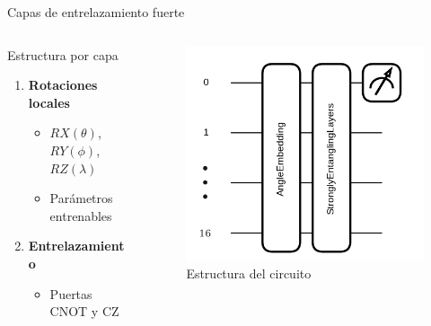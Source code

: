 \documentclass[aspectratio=43]{beamer}
\begin{document}
\begin{frame}{Capas de entrelazamiento fuerte}
  \begin{columns}
    \begin{column}{0.6\textwidth}
      \begin{block}{Estructura por capa}
        \begin{enumerate}
          \item \textbf{Rotaciones locales}
            \begin{itemize}
              \item $RX(\theta)$, $RY(\phi)$, $RZ(\lambda)$
              \item Parámetros entrenables
            \end{itemize}
          \item \textbf{Entrelazamiento}
            \begin{itemize}
              \item Puertas CNOT y CZ
            \end{itemize}
        \end{enumerate}
      \end{block}
    \end{column}
    \begin{column}{0.4\textwidth}
      \begin{figure}
        \includegraphics[width=\textwidth]{circuito.png}
        \caption{Estructura del circuito}
      \end{figure}
    \end{column}
  \end{columns}
\end{frame}
\end{document}
